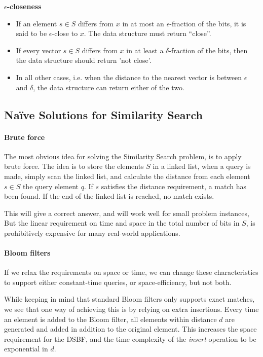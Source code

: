 \documentclass[a4paper,11pt]{article}
\begin{document}
\begin{description}
\item \textbf{$\epsilon$-closeness}
  \begin{itemize}
    \item If an element $s \in S$ differs from $x$ in at most an $\epsilon$-fraction of the bits, it is said to be $\epsilon$-close to $x$. The data structure must return “close”.
    \item If every vector $s \in S$ differs from $x$ in at least a $\delta$-fraction of the bits, then the data structure should return 'not close'.
    \item In all other cases, i.e. when the distance to the nearest vector is between $\epsilon$ and $\delta$, the data structure can return either of the two.
  \end{itemize}

\end{description}

\subsection{Naïve Solutions for Similarity Search}
\label{naive_approaches}

\paragraph{Brute force}
The most obvious idea for solving the Similarity Search problem, is to apply brute force. The idea is to store the elements $S$ in a linked list, when a query is made, simply scan the linked list, and calculate the distance from each element $s \in S$ the query element $q$. If $s$ satisfies the distance requirement, a match has been found. If the end of the linked list is reached, no match exists.

This will give a correct answer, and will work well for small problem instances, But the linear requirement on time and space in the total number of bits in $S$, is prohibitively expensive for many real-world applications.

\paragraph{Bloom filters} If we relax the requirements on space or time, we can change these characteristics to support either constant-time queries, or space-efficiency, but not both.

While keeping in mind that standard Bloom filters only supports exact matches, we see that one way of achieving this is by relying on extra insertions. Every time an element is added to the Bloom filter, all elements within distance $d$ are generated and added in addition to the original element. This increases the space requirement for the DSBF, and the time complexity of the \emph{insert} operation to be exponential in $d$.
\end{document}
